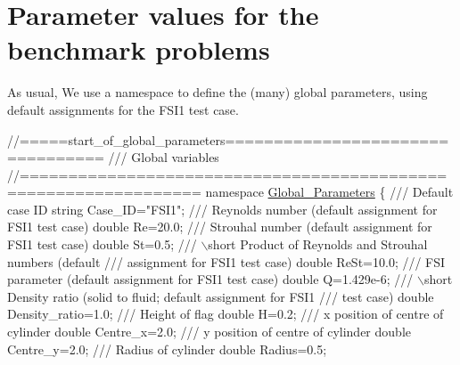  

\hypertarget{index_parameters}{}\section{Parameter values for the benchmark problems}\label{index_parameters}
As usual, We use a namespace to define the (many) global parameters, using default assignments for the F\+S\+I1 test case.

 
\begin{DoxyCodeInclude}
\textcolor{comment}{//=====start\_of\_global\_parameters=================================}
\textcolor{comment}{/// Global variables}
\textcolor{comment}{}\textcolor{comment}{//================================================================}
\textcolor{keyword}{namespace }\hyperlink{namespaceGlobal__Parameters}{Global\_Parameters}
\{
\textcolor{comment}{}
\textcolor{comment}{ /// Default case ID}
\textcolor{comment}{} \textcolor{keywordtype}{string} Case\_ID=\textcolor{stringliteral}{"FSI1"};
\textcolor{comment}{}
\textcolor{comment}{ /// Reynolds number (default assignment for FSI1 test case)}
\textcolor{comment}{} \textcolor{keywordtype}{double} Re=20.0; 
\textcolor{comment}{}
\textcolor{comment}{ /// Strouhal number (default assignment for FSI1 test case)}
\textcolor{comment}{} \textcolor{keywordtype}{double} St=0.5;
\textcolor{comment}{}
\textcolor{comment}{ /// \(\backslash\)short Product of Reynolds and Strouhal numbers (default}
\textcolor{comment}{ /// assignment for FSI1 test case)}
\textcolor{comment}{} \textcolor{keywordtype}{double} ReSt=10.0;
\textcolor{comment}{}
\textcolor{comment}{ /// FSI parameter (default assignment for FSI1 test case)}
\textcolor{comment}{} \textcolor{keywordtype}{double} Q=1.429e-6;
 \textcolor{comment}{}
\textcolor{comment}{ /// \(\backslash\)short Density ratio (solid to fluid; default assignment for FSI1}
\textcolor{comment}{ /// test case)}
\textcolor{comment}{} \textcolor{keywordtype}{double} Density\_ratio=1.0; 
\textcolor{comment}{}
\textcolor{comment}{ /// Height of flag}
\textcolor{comment}{} \textcolor{keywordtype}{double} H=0.2;
 \textcolor{comment}{}
\textcolor{comment}{ /// x position of centre of cylinder}
\textcolor{comment}{} \textcolor{keywordtype}{double} Centre\_x=2.0;
\textcolor{comment}{}
\textcolor{comment}{ /// y position of centre of cylinder}
\textcolor{comment}{} \textcolor{keywordtype}{double} Centre\_y=2.0;
\textcolor{comment}{}
\textcolor{comment}{ /// Radius of cylinder}
\textcolor{comment}{} \textcolor{keywordtype}{double} Radius=0.5;
\textcolor{comment}{}

\end{DoxyCodeInclude}
